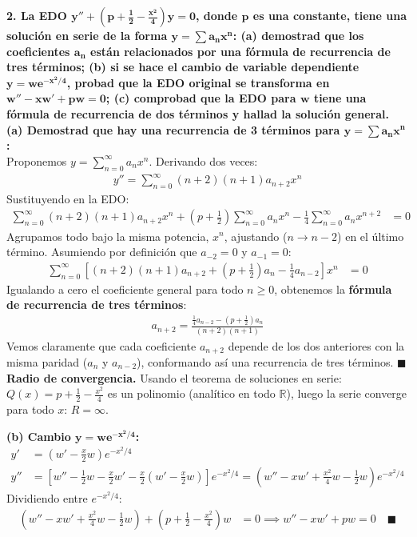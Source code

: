 \documentclass[11pt, a4paper]{article}
\begin{document}
\noindent\textbf{2. La EDO $\bm{y''+(p+\frac{1}{2}-\frac{x^2}{4})y=0}$, donde $\bm{p}$ es una constante, tiene una solución en serie de la forma $\bm{y=\sum a_{n}x^{n}}$: (a) demostrad que los coeficientes $\bm{a_{n}}$ están relacionados por una fórmula de recurrencia de tres términos; (b) si se hace el cambio de variable dependiente $\bm{y=we^{-x^2/4}}$, probad que la EDO original se transforma en $\bm{w''-xw'+pw=0}$; (c) comprobad que la EDO para $\bm{w}$ tiene una fórmula de recurrencia de dos términos y hallad la solución general.} \\
\textbf{(a) Demostrad que hay una recurrencia de 3 términos para $\bm{y=\sum a_n x^n}$:} \\
Proponemos $y = \sum_{n=0}^{\infty} a_n x^n$. Derivando dos veces:
\begin{align*}
y'' = \sum_{n=0}^{\infty} (n+2)(n+1)a_{n+2} x^n
\end{align*}
Sustituyendo en la EDO:
\begin{align*}
\sum_{n=0}^{\infty} (n+2)(n+1)a_{n+2} x^n + \left(p+\frac{1}{2}\right)\sum_{n=0}^{\infty} a_n x^n - \frac{1}{4}\sum_{n=0}^{\infty} a_n x^{n+2} &= 0
\end{align*}
Agrupamos todo bajo la misma potencia, $x^n$, ajustando ($n \to n-2$) en el último término. Asumiendo por definición que $a_{-2} = 0$ y $a_{-1} = 0$:
\begin{align*}
\sum_{n=0}^{\infty} \left[ (n+2)(n+1)a_{n+2} + \left(p+\frac{1}{2}\right)a_n - \frac{1}{4}a_{n-2} \right] x^n &= 0
\end{align*}
Igualando a cero el coeficiente general para todo $n \geq 0$, obtenemos la \textbf{fórmula de recurrencia de tres términos}:
\begin{align*}
a_{n+2} = \frac{\frac{1}{4}a_{n-2} - \left(p+\frac{1}{2}\right)a_n}{(n+2)(n+1)}
\end{align*}
Vemos claramente que cada coeficiente $a_{n+2}$ depende de los dos anteriores con la misma paridad ($a_n$ y $a_{n-2}$), conformando así una recurrencia de tres términos. \quad $\blacksquare$ \\

\textbf{Radio de convergencia.} Usando el teorema de soluciones en serie: $Q(x)=p+\frac12-\frac{x^2}{4}$ es un polinomio (analítico en todo $\mathbb{R}$), luego la serie converge para todo $x$: $R=\infty$.

\vspace{0.2cm}\noindent\textbf{(b) Cambio $\bm{y=we^{-x^2/4}}$:} \\
\begin{align*}
y' &= \left(w' - \frac{x}{2}w\right)e^{-x^2/4} \\
y'' &= \left[w'' - \frac{1}{2}w - \frac{x}{2}w' - \frac{x}{2}\left(w' - \frac{x}{2}w\right)\right]e^{-x^2/4} = \left(w'' - xw' + \frac{x^2}{4}w - \frac{1}{2}w\right)e^{-x^2/4}
\end{align*}
Dividiendo entre $e^{-x^2/4}$:
\begin{align*}
\left(w'' - xw' + \frac{x^2}{4}w - \frac{1}{2}w\right) + \left(p + \frac{1}{2} - \frac{x^2}{4}\right)w &= 0 \implies w'' - xw' + pw = 0 \quad \blacksquare
\end{align*}
\end{document}
